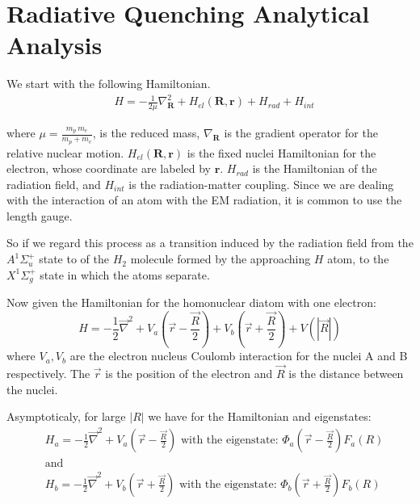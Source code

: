 \section{Radiative Quenching Analytical Analysis}

We start with the following Hamiltonian.
\begin{equation}\label{eqH1} 
\begin{split} 
& H = -\frac{1}{2\mu}\nabla^2_{\mathbf{R}} + H_{el}(\mathbf{R},\mathbf{r}) + H_{rad} + H_{int} 
\end{split} 
\end{equation} 

where $ \mu = \frac{m_p\,m_e}{m_p + m_e} $, is the reduced mass, $ \nabla_{\mathbf{R}} $ is the gradient operator for the relative nuclear motion. $ H_{el}(\mathbf{R},\mathbf{r}) $ is the fixed nuclei Hamiltonian for the electron, whose coordinate are labeled by $ \mathbf{r} $. $ H_{rad} $ is the Hamiltonian of the radiation field, and $ H_{int} $ is the radiation-matter coupling. Since we are dealing with the interaction of an atom with the EM radiation, it is common to use the length gauge.  

So if we regard this process as a transition induced by the radiation field from the $ A^{1}\Sigma^{+}_u $ state to of the $ H_2 $ molecule formed by the approaching $ H $ atom, to the $ X^{1}\Sigma^{+}_g $ state in which the atoms separate.

Now given the Hamiltonian for the homonuclear diatom with one electron:
\begin{equation}\label{hdia}
  H = -\frac{1}{2}\vec{\nabla}^2 + V_a(\vec{r} - \frac{\vec{R}}{2}) + V_b(\vec{r} + \frac{\vec{R}}{2}) + V(|\vec{R}|) 
\end{equation}
where $ V_a, V_b $ are the electron nucleus Coulomb interaction for the nuclei A and B respectively. The $ \vec{r} $ is the position of the electron and $ \vec{R} $ is the distance between the nuclei.

Asymptoticaly, for large $ |R| $ we have for the Hamiltonian and eigenstates:
\begin{equation}
\begin{split} 
  & H_a = -\frac{1}{2}\vec{\nabla}^2 + V_a(\vec{r} - \frac{\vec{R}}{2}) \text{ with the eigenstate: } \Phi_a(\vec{r} - \frac{\vec{R}}{2}) F_a(R) \\
  & \text{and} \\
  & H_b = -\frac{1}{2}\vec{\nabla}^2 + V_b(\vec{r} + \frac{\vec{R}}{2}) \text{ with the eigenstate: } \Phi_b(\vec{r} + \frac{\vec{R}}{2}) F_b(R) \\
\end{split} 
\end{equation}

